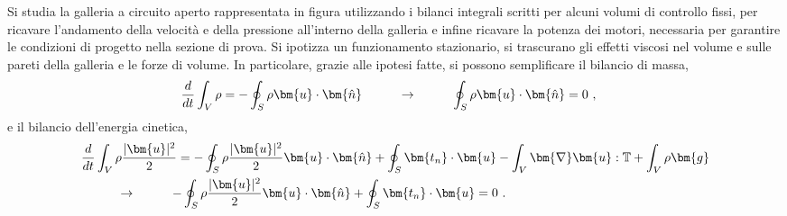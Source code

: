 \partone
Si studia la galleria a circuito aperto rappresentata in figura utilizzando i bilanci integrali scritti per alcuni volumi di controllo fissi, per ricavare l'andamento della velocità e della pressione all'interno della galleria e infine ricavare la potenza dei motori, necessaria per garantire le condizioni di progetto nella sezione di prova. Si ipotizza un funzionamento stazionario, si trascurano gli effetti viscosi nel volume e sulle pareti della galleria e le forze di volume. In particolare, grazie alle ipotesi fatte, si possono semplificare il bilancio di massa,
\begin{equation}
\begin{aligned}
 & \dfrac{d}{dt} \int_V \rho = - \oint_{S} \rho \bm{u} \cdot \bm{\hat{n}} 
 \hspace{1.0cm} \rightarrow \hspace{1.0cm} \oint_{S} \rho \bm{u} \cdot \bm{\hat{n}} = 0 \ ,
\end{aligned}
\end{equation}
e il bilancio dell'energia cinetica,
\begin{equation}
\begin{aligned}
 & \dfrac{d}{dt} \int_V \rho \dfrac{|\bm{u}|^2}{2} = - \oint_{S} \rho \dfrac{|\bm{u}|^2}{2} \bm{u} \cdot \bm{\hat{n}} + \oint_S \bm{t_n} \cdot \bm{u} - \int_V \bm{\nabla} \bm{u} : \mathbb{T} + \int_V \rho \bm{g} \\
 & \hspace{1.0cm} \rightarrow \hspace{1.0cm} 
 - \oint_{S} \rho \dfrac{|\bm{u}|^2}{2} \bm{u} \cdot \bm{\hat{n}} + \oint_S \bm{t_n} \cdot \bm{u} = 0 \ . 
\end{aligned}
\end{equation}


